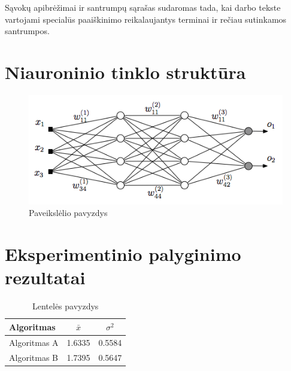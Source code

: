 \documentclass{VUMIFPSbakalaurinis}
\begin{document}
\printbibliography[heading=bibintoc]  %

Sąvokų apibrėžimai ir santrumpų sąrašas sudaromas tada, kai darbo tekste
vartojami specialūs paaiškinimo reikalaujantys terminai ir rečiau sutinkamos
santrumpos.

\appendix  %

\section{Niauroninio tinklo struktūra}
\begin{figure}[H]
    \centering
    \includegraphics[scale=0.5]{img/MLP}
    \caption{Paveikslėlio pavyzdys}
    \label{img:mlp}
\end{figure}


\section{Eksperimentinio palyginimo rezultatai}
\begin{table}[H]\footnotesize
  \centering
  \caption{Lentelės pavyzdys}
  {\begin{tabular}{|l|c|c|} \hline
    Algoritmas & $\bar{x}$ & $\sigma^{2}$ \\
    \hline
    Algoritmas A  & 1.6335    & 0.5584       \\
    Algoritmas B  & 1.7395    & 0.5647       \\
    \hline
  \end{tabular}}
  \label{tab:table example}
\end{table}
\end{document}
